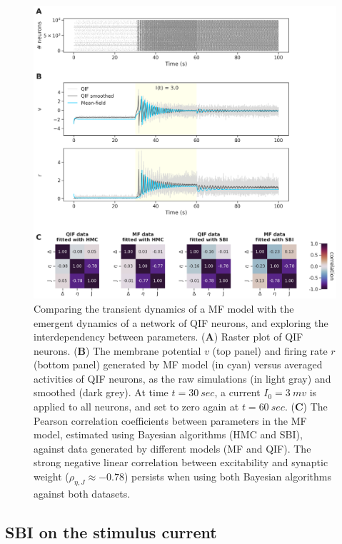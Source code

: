 \documentclass[preprint,11pt,authoryear]{elsarticle}
\begin{document}
\begin{figure}
     \centering
     \includegraphics[width=\linewidth]{Figs/Fig6.png}
     \caption{Comparing the transient dynamics of a MF model with the emergent dynamics of a network of QIF neurons, and exploring the interdependency between parameters. (\textbf{A}) Raster plot of QIF neurons. (\textbf{B}) The membrane potential $v$ (top panel) and firing rate $r$ (bottom panel) generated by MF model (in cyan) versus averaged activities of QIF neurons, as the raw simulations (in light gray) and smoothed (dark grey). At time $t=30~sec$, a current $I_0=3~ mv$ is applied to all neurons, and set to zero again at $t=60~sec$. (\textbf{C}) The Pearson correlation coefficients between parameters in the MF model, estimated using Bayesian algorithms (HMC and SBI), against data generated by different models (MF and QIF). The strong negative linear correlation between excitability and synaptic weight ($\rho_{\eta, J} \approx -0.78$) persists when using both Bayesian algorithms against both datasets.}
     \label{fig:QIF_correlations}
 \end{figure}



 
\subsection{SBI on the stimulus current}
\end{document}
